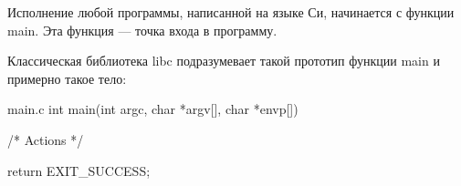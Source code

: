 Исполнение любой программы, написанной на языке Си, начинается с функции main. Эта функция --- точка входа в программу.

Классическая библиотека libc подразумевает такой прототип функции main и примерно такое тело:

\begin{CCode}{main.c}
	int main(int argc, char *argv[], char *envp[]) { 
		
		/* Actions */ 		
 		
 		return EXIT_SUCCESS; 
} \end{CCode}

	
	
